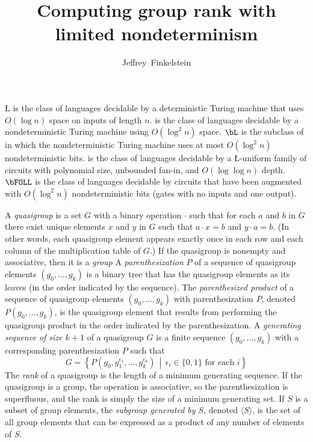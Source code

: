 \documentclass{article}
\title{Computing group rank with limited nondeterminism}
\author{Jeffrey~Finkelstein}
\begin{document}
\maketitle

\L{} is the class of languages decidable by a deterministic Turing machine that uses $O(\log n)$ space on inputs of length $n$.
\NL{} is the class of languages decidable by a nondeterministic Turing machine using $O(\log^2 n)$ space.
$\bL$ is the subclass of \NL{} in which the nondeterministic Turing machine uses at most $O(\log^2 n)$ nondeterministic bits.
\FOLL{} is the class of languages decidable by a \L-uniform family of circuits with polynomial size, unbounded fan-in, and $O(\log \log n)$ depth.
$\bFOLL$ is the class of languages decidable by \FOLL{} circuits that have been augmented with $O(\log^2 n)$ nondeterministic bits (gates with no inputs and one output).

A \emph{quasigroup} is a set $G$ with a binary operation $\cdot$ such that for each $a$ and $b$ in $G$ there exist unique elements $x$ and $y$ in $G$ such that $a \cdot x = b$ and $y \cdot a = b$.
(In other words, each quasigroup element appears exactly once in each row and each column of the multiplication table of $G$.)
If the quasigroup is nonempty and associative, then it is a \emph{group}
A \emph{parenthesization} $P$ of a sequence of quasigroup elements $(g_0, \dotsc, g_k)$ is a binary tree that has the quasigroup elements as its leaves (in the order indicated by the sequence).
The \emph{parenthesized product} of a sequence of quasigroup elements $(g_0, \dotsc, g_k)$ with parenthesization $P$, denoted $P(g_0, \dotsc, g_k)$, is the quasigroup element that results from performing the quasigroup product in the order indicated by the parenthesization.
A \emph{generating sequence of size $k + 1$} of a quasigroup $G$ is a finite sequence $(g_0, \dotsc, g_k)$ with a corresponding parenthesization $P$ such that
$$
G = \left\{P(g_0, g_1^{\epsilon_1}, \dotsc, g_k^{\epsilon_k}) \, \middle| \, \epsilon_i \in \{0, 1\} \text{ for each } i \right\}
$$
The \emph{rank} of a quasigroup is the length of a minimum generating sequence.
If the quasigroup is a group, the operation is associative, so the parenthesization is superfluous, and the rank is simply the size of a minimum generating set.
If $S$ is a subset of group elements, the \emph{subgroup generated by $S$}, denoted $\langle S \rangle$, is the set of all group elements that can be expressed as a product of any number of elements of $S$.
\end{document}
